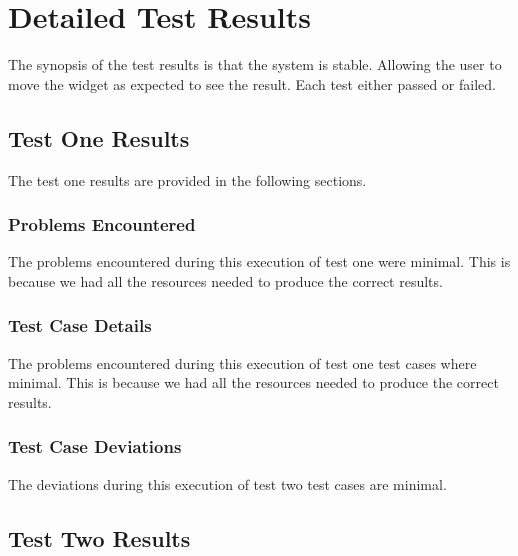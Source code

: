 
\chapter{Detailed Test Results}
\label{loc:DetailedTestResults}


The synopsis of the test results is that the system is stable. Allowing the user to move the widget as expected to see the result. Each test either passed or failed.

\section{Test One Results}
\label{loc:TestOneResults}


The test one results are provided in the following sections.

\subsection{Problems Encountered}
\label{loc:TestOneResultsProblems}


The problems encountered during this execution of test one were minimal. This is because we had all the resources needed to produce the correct results.


\subsection{Test Case Details}
\label{loc:TestOneResultsProblems}


The problems encountered during this execution of test one test cases where minimal. This is because we had all the resources needed to produce the correct results.


\subsection{Test Case Deviations}
\label{loc:TestTwoResultsProblems}


The deviations during this execution of test two test cases are minimal.

\section{Test Two Results}
\label{loc:TestTwoResults}


